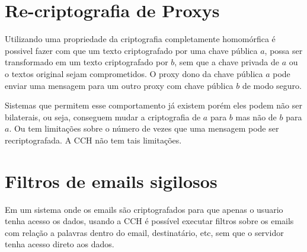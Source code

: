 \section{Re-criptografia de Proxys}
Utilizando uma propriedade da criptografia completamente homomórfica é possivel fazer com que um texto criptografado por uma chave pública $a$, possa ser transformado em um texto criptografado por $b$, sem que a chave privada de $a$ ou o textos original sejam comprometidos.
O proxy dono da chave pública $a$ pode enviar uma mensagem para um outro proxy com chave pública $b$ de modo seguro.
	
Sistemas que permitem esse comportamento já existem porém eles podem não ser bilaterais, ou seja, conseguem mudar a criptografia de $a$ para $b$ mas não de $b$ para $a$. Ou tem limitações sobre o número de vezes que uma mensagem pode ser recriptografada. A CCH não tem tais limitações.

\section{Filtros de emails sigilosos}
Em um sistema onde os emails são criptografados para que apenas o usuario tenha acesso os dados, usando a CCH é possível executar filtros sobre os emails com relação a palavras dentro do email, destinatário, etc, sem que o servidor tenha acesso direto aos dados.